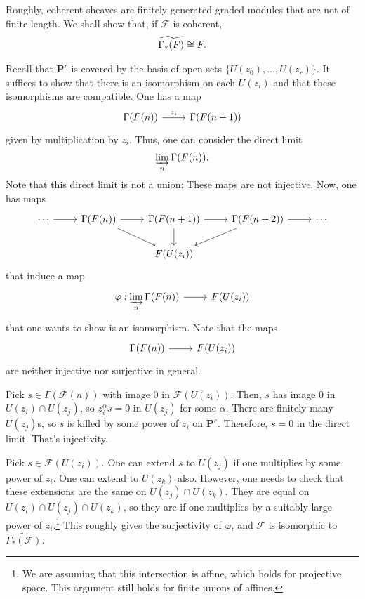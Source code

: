 \documentclass [11 pt, oneside] {article}
\begin{document}
Roughly, coherent sheaves are finitely generated graded modules that are not of finite length. We shall show that, if $\mathscr{F}$ is coherent,
\begin{align*}
	\widetilde{\Gamma_*(\mathscr{F}) } \isomto \mathscr{F}.
\end{align*}

Recall that $\mathbf{P}^r$ is covered by the basis of open sets $\{U(z_0),\hdots, U (z_r)\}$. It suffices to show that there is an isomorphism on each $U(z_i)$ and that these isomorphisms are compatible. One has a map
\[
\begin{tikzcd}
	\Gamma(\mathscr{F}(n)) \ar[r,"z_i"] &\Gamma(\mathscr{F}(n+1))
\end{tikzcd}
\]
given by multiplication by $z_i$. Thus, one can consider the direct limit
\begin{align*}
	\varinjlim_{n} \Gamma(\mathscr{F}(n)).
\end{align*}
Note that this direct limit is not a union: These maps are not injective. Now, one has maps
\[
\begin{tikzcd}
	\cdots \ar[r] & \Gamma(\mathscr{F}(n)) \ar[r]\ar[dr] & \Gamma(\mathscr{F}(n+1)) \ar[r]\ar[d] &\Gamma(\mathscr{F}(n+2)) \ar[r]\ar[dl] &\cdots\\
			      &&\mathscr{F}(U(z_i))
\end{tikzcd}
\]
that induce a map
\[
\begin{tikzcd}
	\varphi:\displaystyle\varinjlim_{n} \Gamma(\mathscr{F}(n))\ar[r]&\mathscr{F}(U(z_i))
\end{tikzcd}
\]
that one wants to show is an isomorphism. Note that the maps 
\[
\begin{tikzcd}
\Gamma(\mathscr{F}(n))\ar[r]& \mathscr{F}(U(z_i))
\end{tikzcd}
\]
are neither injective nor surjective in general.

Pick $s\in \Gamma(\mathscr{F}(n))$ with image $0$ in $\mathscr{F}(U(z_i))$. Then, $s$ has image $0$ in $U(z_i)\cap U (z_j)$, so $z_i^\alpha s=0$ in $U(z_j)$ for some $\alpha$. There are finitely many $U(z_j)$s, so $s$ is killed by some power of $z_i$ on $\mathbf{P}^r$. Therefore, $s=0$ in the direct limit. That's injectivity.

Pick $s\in \mathscr{F}(U(z_i))$. One can extend $s$ to $U(z_j)$ if one multiplies by some power of $z_i$. One can extend to $U(z_k)$ also. However, one needs to check that these extensions are the same on $U(z_j)\cap U (z_k)$. They are equal on $U(z_i)\cap U (z_j)\cap U (z_k)$, so they are if one multiplies by a suitably large power of $z_i$.\footnote{We are assuming that this intersection is affine, which holds for projective space. This argument still holds for finite unions of affines.} This roughly gives the surjectivity of $\varphi$, and $\mathscr{F}$ is isomorphic to $\widetilde{\Gamma_*(\mathscr{F})}$. 
\end{document}
